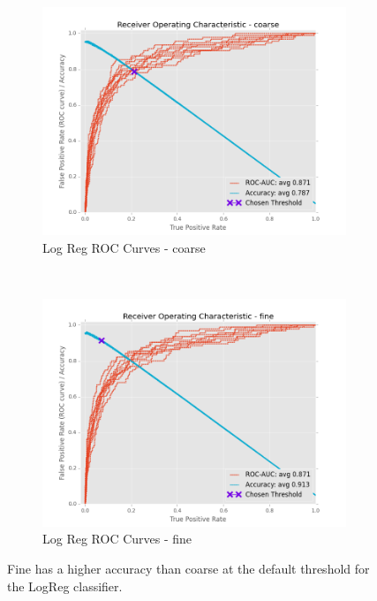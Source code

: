 \documentclass[ms]{nuthesis}
\begin{document}
\FloatBarrier
\begin{figure}[!htb]
    \centering
    \begin{subfigure}[t]{0.5\textwidth}
        \centering
        \includegraphics[width=\textwidth]{fig/LogReg_FindThreshold_RocCurve_coarse}
        \caption{Log Reg ROC Curves - coarse}
    \end{subfigure}%
    ~
    \begin{subfigure}[t]{0.5\textwidth}
        \centering
        \includegraphics[width=\textwidth]{fig/LogReg_FindThreshold_RocCurve_fine}
        \caption{Log Reg ROC Curves - fine}
    \end{subfigure}
    \caption{Fine has a higher accuracy than coarse at the default threshold for the LogReg classifier.}
    \label{fig:LogRegThreshAcc}
\end{figure}
\FloatBarrier
\end{document}
